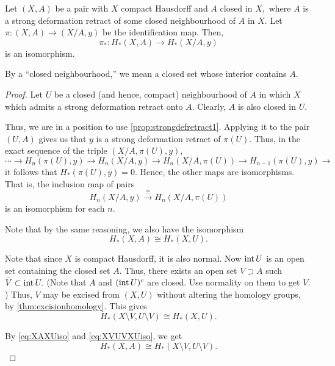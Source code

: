 \documentclass[12pt]{article}
\begin{document}
\begin{thm} \label{thm:strongdefretract2}
	Let $(X, A)$ be a pair with $X$ compact Hausdorff and $A$ closed in $X,$ where $A$ is a strong deformation retract of some closed neighbourhood of $A$ in $X.$ Let $\pi:(X, A) \to (X/A, y)$ be the identification map. Then,
	\begin{equation*} 
		\pi_*:H_*(X, A) \to H_*(X/A, y)
	\end{equation*}
	is an isomorphism.
\end{thm}
By a ``closed neighbourhood,'' we mean a closed set whose interior contains $A.$
\begin{proof} 
	Let $U$ be a closed (and hence, compact) neighbourhood of $A$ in which $X$ which admits a strong deformation retract onto $A.$ Clearly, $A$ is also closed in $U.$

	Thus, we are in a position to use \cref{prop:strongdefretract1}. Applying it to the pair $(U, A)$ gives us that $y$ is a strong deformation retract of $\pi(U).$ Thus, in the exact sequence of the triple $(X/A, \pi(U), y),$
	\begin{equation*} 
		\cdots\to H_n(\pi(U), y)\to H_n(X/A, y) \to H_n(X/A, \pi(U)) \to H_{n-1}(\pi(U), y) \to
	\end{equation*}
	it follows that $H_*(\pi(U), y) = 0.$ Hence, the other maps are isomorphisms. That is, the inclusion map of pairs
	\begin{equation} \label{eq:XAyXApiU}
		H_n(X/A, y) \overset{\cong}{\longrightarrow} H_n(X/A, \pi(U))
	\end{equation}
	is an isomorphism for each $n.$

	Note that by the same reasoning, we also have the isomorphism
	\begin{equation} \label{eq:XAXUiso}
		H_*(X, A) \cong H_*(X, U).
	\end{equation}

	Note that since $X$ is compact Hausdorff, it is also normal. Now $\operatorname{int} U$ is an open set containing the closed set $A.$ Thus, there exists an open set $V \supset A$ such $\bar{V} \subset \operatorname{int} U.$ (Note that $A$ and $(\operatorname{int} U)^c$ are closed. Use normality on them to get $V.$) Thus, $V$ may be excised from $(X, U)$ without altering the homology groups, by \cref{thm:excisionhomology}. This gives
	\begin{equation} \label{eq:XVUVXUiso}
		H_*(X\setminus V, U\setminus V) \cong H_*(X, U).
	\end{equation}

	By \cref{eq:XAXUiso} and \cref{eq:XVUVXUiso}, we get
	\begin{equation} \label{eq:XAXVUViso}
		H_*(X, A) \cong H_*(X\setminus V, U\setminus V).
	\end{equation}


\end{proof}
\end{document}
